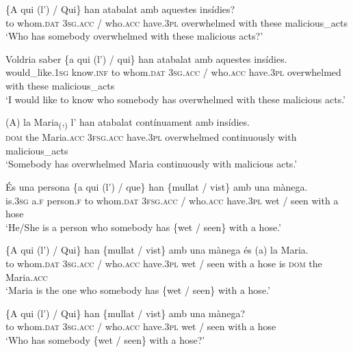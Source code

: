 \documentclass[output=paper,colorlinks,citecolor=brown,modfonts,nonflat]{langsci/langscibook}
\begin{document}
 \ex \label{ex:royo:16c}
 \gll \{A qui (l’) / Qui\} han atabalat amb aquestes insídies?\\
to whom.\textsc{dat} \textsc{3sg.acc} / who.\textsc{acc} have.\textsc{3pl} overwhelmed with these malicious\_acts\\
\glt ‘Who has somebody overwhelmed with these malicious acts?’

 \ex \label{ex:royo:16d}
 \gll Voldria saber \{a qui (l’) / qui\} han atabalat amb aquestes insídies.\\
 would\_like.\textsc{1sg} know.\textsc{inf}  to whom.\textsc{dat} \textsc{3sg.acc} / who.\textsc{acc} have.\textsc{3pl} overwhelmed with these malicious\_acts\\
\glt ‘I would like to know who somebody has overwhelmed with these malicious acts.’

\largerpage
\ex \label{ex:royo:16e}
 \gll (A) la Maria\textsubscript{(},\textsubscript{)}  l’ han atabalat contínuament amb insídies.\\
 \textsc{dom} the Maria.\textsc{acc} \textsc{3fsg.acc} have.\textsc{3pl} overwhelmed continuously with malicious\_acts\\
\glt ‘Somebody has overwhelmed Maria continuously with malicious acts.’

 \z
 \z


\ea%
 \label{ex:royo:17}
 \ea \label{ex:royo:17a}
 \gll És una persona \{a qui (l’) / que\} han \{mullat / vist\} amb una mànega.\\
 is.\textsc{3sg} a.\textsc{f} person.\textsc{f} to whom.\textsc{dat} \textsc{3fsg.acc} / who.\textsc{acc} have.\textsc{3pl} {\db}wet / seen with a hose\\
\glt ‘He/She is a person who somebody has \{wet / seen\} with a hose.’

 \ex \label{ex:royo:17b}
 \gll \{A qui (l’) / Qui\} han \{mullat / vist\} amb una mànega és (a) la Maria.\\
 to whom.\textsc{dat} \textsc{3sg.acc} / who.\textsc{acc} have.\textsc{3pl} {\db}wet / seen with a hose is \textsc{dom} the Maria.\textsc{acc}\\
\glt ‘Maria is the one who somebody has \{wet / seen\} with a hose.’

 \ex \label{ex:royo:17c}
 \gll \{A qui (l’) / Qui\} han \{mullat / vist\} amb una mànega?\\
 to whom.\textsc{dat} \textsc{3sg.acc} / who.\textsc{acc} have.\textsc{3pl} {\db}wet / seen with a hose\\
\glt ‘Who has somebody \{wet / seen\} with a hose?’
\end{document}
